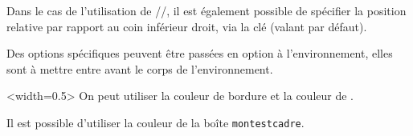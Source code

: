 \documentclass[french,11pt,a4paper]{article}
\begin{document}
Dans le cas de l'utilisation de \MontreCode{[Logo=...]}/\MontreCode{[Icone=...]}/\MontreCode{[Emoji=...]}, il est également possible de spécifier la position relative par rapport au coin inférieur droit, via la clé \MontreCode{[OffsetDeco=\{xoffset,yoffset\}]} (valant \MontreCode{\{-10pt,10pt\}} par défaut).

\medskip

Des options spécifiques  peuvent être passées en option à l'environnement, elles sont à mettre entre  avant le corps de l'environnement.

\pagebreak

\begin{demohigh}[language=latex/latex2,style/main=cyan!10,style/code=cyan!10]
\setcounter{CompteurBoiteDemo}{0}
\begin{BoiteDeDemo}[Compteur=false]
\lipsum[1][1-2]
\end{BoiteDeDemo}
\end{demohigh}

\begin{demohigh}[language=latex/latex2,style/main=cyan!10,style/code=cyan!10]
\begin{BoiteDeDemo}[Pluriel]<width=0.5\linewidth>
On peut utiliser la couleur de \textcolor{cbcoulbord}{bordure} et la couleur de .

Il est possible d'utiliser la \textcolor{cbcoulbordmontestcadre}{couleur} de la boîte \texttt{montestcadre}.
\end{BoiteDeDemo}
\end{demohigh}

\begin{demohigh}[language=latex/latex2,style/main=cyan!10,style/code=cyan!10]
\begin{BoiteDeDemo}[SousTitre={Un petit sous-titre}]
\lipsum[1][1-2]
\end{BoiteDeDemo}
\end{demohigh}

\begin{demohigh}[language=latex/latex2,style/main=cyan!10,style/code=cyan!10]
\begin{BoiteDeDemo}[ComplementTitre={ - Un complément de titre}]%
\lipsum[1][1-2]
\end{BoiteDeDemo}
\end{demohigh}

\begin{demohigh}[language=latex/latex2,style/main=cyan!10,style/code=cyan!10]
\begin{BoiteDeDemo}[ModifLabel={ super important}]%
\lipsum[1][1-2]
\end{BoiteDeDemo}
\end{demohigh}
\end{document}

